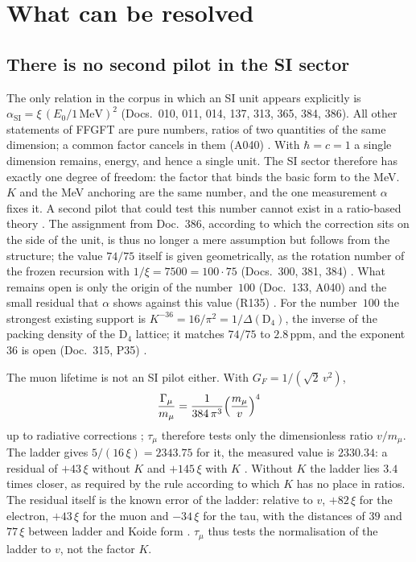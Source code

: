 \section{What can be resolved}

\subsection{There is no second pilot in the SI sector}

The only relation in the corpus in which an SI unit appears explicitly is
$\alpha_{\text{SI}}=\xi\,(E_0/1\,\text{MeV})^2$ (Docs.~010, 011, 014, 137, 313, 365, 384, 386). All other
statements of FFGFT are pure numbers, ratios of two quantities of the same dimension; a common factor
cancels in them (A040) \BM. With $\hbar=c=1$ a single dimension remains, energy, and hence a single unit.
The SI sector therefore has exactly one degree of freedom: the factor that binds the basic form to the
MeV. $K$ and the MeV anchoring are the same number, and the one measurement $\alpha$ fixes it. A second
pilot that could test this number cannot exist in a ratio-based theory \BM. The assignment from
Doc.~386, according to which the correction sits on the side of the unit, is thus no longer a mere
assumption but follows from the structure; the value $74/75$ itself is
given geometrically, as the rotation number of the frozen recursion with $1/\xi=7500=100\cdot75$
(Docs.~300, 381, 384) \BM. What remains open is only the origin of the number~$100$ (Doc.~133, A040)
and the small residual that $\alpha$ shows against this value (R135) \SM. For the number~$100$ the
strongest existing support is $K^{-36}=16/\pi^2=1/\Delta(\mathrm{D}_4)$, the inverse of the packing
density of the $\mathrm{D}_4$ lattice; it matches $74/75$ to $2.8$\,ppm, and the exponent~$36$ is open
(Doc.~315, P35) \KM.

The muon lifetime is not an SI pilot either. With $G_F=1/(\sqrt2\,v^2)$,
\begin{equation}
  \frac{\Gamma_\mu}{m_\mu}=\frac{1}{384\,\pi^3}\Bigl(\frac{m_\mu}{v}\Bigr)^4
\end{equation}
up to radiative corrections \QM; $\tau_\mu$ therefore tests only the dimensionless ratio $v/m_\mu$. The
ladder gives $5/(16\,\xi)=2343.75$ for it, the measured value is $2330.34$: a residual of $+43\,\xi$
without $K$ and $+145\,\xi$ with $K$ \KM. Without $K$ the ladder lies $3.4$ times closer, as required by
the rule according to which $K$ has no place in ratios. The residual itself is the known error of the
ladder: relative to $v$, $+82\,\xi$ for the electron, $+43\,\xi$ for the muon and $-34\,\xi$ for the tau,
with the distances of $39$ and $77\,\xi$ between ladder and Koide form \KM. $\tau_\mu$ thus tests the
normalisation of the ladder to $v$, not the factor $K$.

